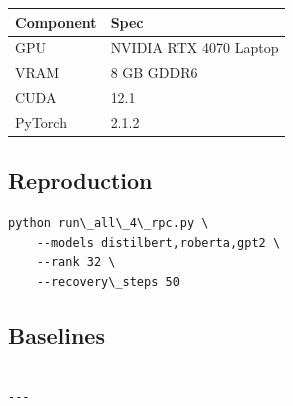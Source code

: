 \begin{table}[H]
\centering
\small
\begin{tabular}{ll}
\toprule
\textbf{Component} & \textbf{Spec} \\
\midrule
GPU & NVIDIA RTX 4070 Laptop \\
VRAM & 8 GB GDDR6 \\
CUDA & 12.1 \\
PyTorch & 2.1.2 \\
\bottomrule
\end{tabular}
\end{table}

\subsection{Reproduction}

\begin{lstlisting}
python run\_all\_4\_rpc.py \
    --models distilbert,roberta,gpt2 \
    --rank 32 \
    --recovery\_steps 50
\end{lstlisting}

\subsection{Baselines}

\begin{lstlisting}

---
\end{lstlisting}